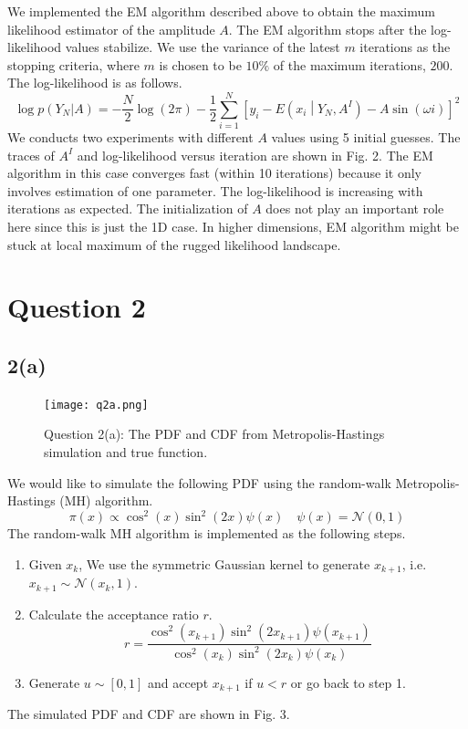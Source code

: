 \documentclass[a4paper, 11pt]{article}
\begin{document}
We implemented the EM algorithm described above to obtain the maximum likelihood estimator of the amplitude $A$. The EM algorithm stops after the log-likelihood values stabilize. We use the variance of the latest $m$ iterations as the stopping criteria, where $m$ is chosen to be $10\%$ of the maximum iterations, $200$. The log-likelihood is as follows. 
\begin{equation}
\log p(Y_N|A) = -\frac{N}{2}\log(2\pi) - \frac{1}{2}\sum_{i=1}^N \left[y_i - E\left(x_i\middle| Y_N, A^I \right) - A\sin(\omega i) \right]^2
\end{equation}
We conducts two experiments with different $A$ values using 5 initial guesses. The traces of $A^I$ and log-likelihood versus iteration are shown in Fig. 2. The EM algorithm in this case converges fast (within 10 iterations) because it only involves estimation of one parameter. The log-likelihood is increasing with iterations as expected. The initialization of $A$ does not play an important role here since this is just the 1D case. In higher dimensions, EM algorithm might be stuck at local maximum of the rugged likelihood landscape. 



\section*{Question 2}
\subsection*{2(a)}


\begin{figure}
	\begin{center}
		\texttt{[image: q2a.png]}
		\caption{Question 2(a): The PDF and CDF from Metropolis-Hastings simulation and true function. }
	\end{center}
\end{figure}

We would like to simulate the following PDF using the random-walk Metropolis-Hastings (MH) algorithm. 
\begin{equation}
\pi(x) \propto \cos^2(x)\sin^2(2x)\psi(x) \quad \psi(x) = \mathcal{N}(0,1)
\end{equation}
The random-walk MH algorithm is implemented as the following steps. 
\begin{enumerate}
\item Given $x_k$, We use the symmetric Gaussian kernel to generate $x_{k+1}$, i.e. $x_{k+1}\sim\mathcal{N}(x_k, 1)$. 
\item Calculate the acceptance ratio $r$. 
\begin{equation}
r = \frac{\cos^2(x_{k+1})\sin^2(2x_{k+1})\psi(x_{k+1})}{\cos^2(x_k)\sin^2(2x_k)\psi(x_k)}
\end{equation}
\item Generate $u\sim [0,1]$ and accept $x_{k+1}$ if $u < r$ or go back to step 1. 
\end{enumerate}
The simulated PDF and CDF are shown in Fig. 3. 
\end{document}
